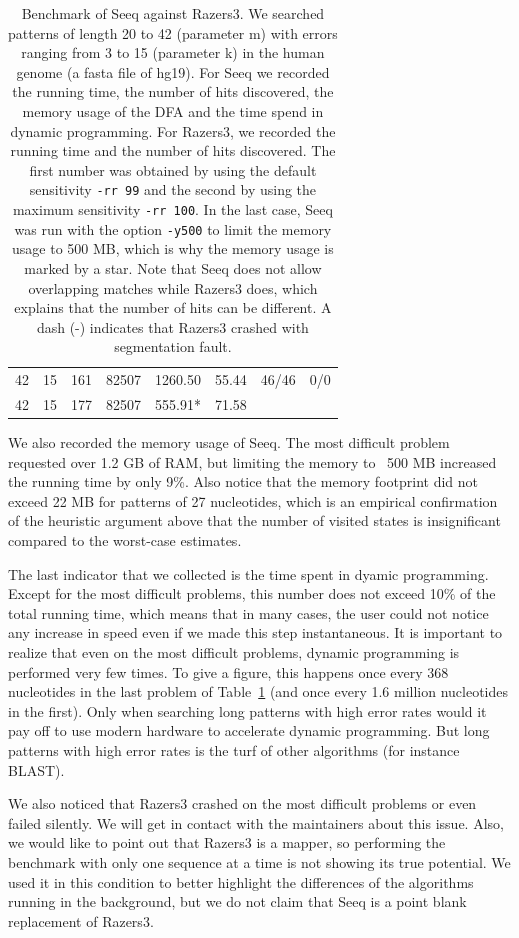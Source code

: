 \documentclass[12pt]{article}
\begin{document}
\begin{table}[h]
\begin{tabular}{c|c||c|c|c|c||c|c}
  42 & 15 & 161 & 82507  & 1260.50 & 55.44 & 46/46 & 0/0 \\
  42 & 15 & 177 & 82507  & 555.91* & 71.58 \\
\end{tabular}
\caption{Benchmark of Seeq against Razers3. We searched patterns of
length 20 to 42 (parameter m) with errors ranging from 3 to 15
(parameter k) in the human genome (a fasta file of hg19). For Seeq
we recorded the running time, the number of hits discovered, the
memory usage of the DFA and the time spend in dynamic programming.
For Razers3, we recorded the running time and the number of hits
discovered. The first number was obtained by using the default sensitivity
\texttt{-rr 99} and the second by using the maximum sensitivity 
\texttt{-rr 100}. In the last case, Seeq was run with the option
\texttt{-y500} to limit the memory usage to 500 MB, which is why
the memory usage is marked by a star. Note that Seeq does not
allow overlapping matches while Razers3 does, which explains that
the number of hits can be different. A dash (-) indicates that
Razers3 crashed with segmentation fault.
\label{benchmark}
}
\end{table}

We also recorded the memory usage of Seeq. The most difficult problem
requested over 1.2 GB of RAM, but limiting the memory to ~500 MB
increased the running time by only 9\%. Also notice that the
memory footprint did not exceed 22 MB for patterns of 27
nucleotides, which is an empirical confirmation of the heuristic
argument above that the number of visited states is insignificant
compared to the worst-case estimates.

The last indicator that we collected is the time spent in dyamic
programming. Except for the most difficult problems, this number
does not exceed 10\% of the total running time, which means that
in many cases, the user could not notice any increase in speed even
if we made this step instantaneous. It is important to realize that
even on the most difficult problems, dynamic programming is performed
very few times. To give a figure, this happens once every 368
nucleotides in the last problem of Table~\ref{benchmark} (and once
every 1.6 million nucleotides in the first). Only when searching
long patterns with high error rates would it pay off to use
modern hardware to accelerate dynamic programming. But long patterns
with high error rates is the turf of other algorithms (for instance
BLAST).

We also noticed that Razers3 crashed on the most difficult problems
or even failed silently. We will get in contact with the maintainers
about this issue. Also, we would like to point out that Razers3 is
a mapper, so performing the benchmark with only one sequence
at a time is not showing its true potential. We used it in this
condition to better highlight the differences of the algorithms
running in the background, but we do not claim that Seeq is a point
blank replacement of Razers3.
\end{document}
